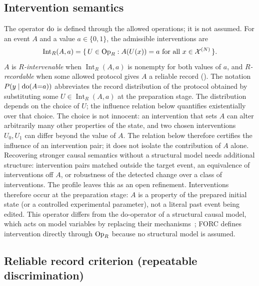 \subsection{Intervention semantics}\label{sec:intervention-semantics}

The operator $\mathrm{do}$ is defined through the allowed operations;
it is not assumed.  For an event $A$ and a value $a \in \{0, 1\}$, the
admissible interventions are
\begin{equation}
  \operatorname{Int}_R(A, a)
  = \{\, U \in \mathrm{Op}_{R} :
     A(U(x)) = a \text{ for all } x \in \mathcal{X}^{(N)} \,\}.\label{eq:intervention-set}
\end{equation}
$A$ is \emph{$R$-intervenable} when $\operatorname{Int}_R(A, a)$ is
nonempty for both values of $a$, and \emph{$R$-recordable} when some
allowed protocol gives $A$ a reliable record
().  The notation
$P(y \mid \mathrm{do}(A{=}a))$ abbreviates the record distribution of
the protocol obtained by substituting some
$U \in \operatorname{Int}_R(A, a)$ at the preparation stage.  The
distribution depends on the choice of $U$; the influence relation below
quantifies existentially over that choice.  The choice is not
innocent: an intervention that sets $A$ can alter arbitrarily many
other properties of the state, and two chosen interventions $U_0, U_1$
can differ beyond the value of $A$.  The relation below therefore
certifies the influence of an intervention pair; it does not isolate
the contribution of $A$ alone.  Recovering stronger causal semantics
without a structural model needs additional structure: intervention
pairs matched outside the target event, an equivalence of
interventions off $A$, or robustness of the detected change over a
class of interventions.  The profile leaves this as an open
refinement. Interventions therefore
occur at the preparation stage: $A$ is a property of the prepared
initial state (or a controlled experimental parameter), not a literal
past event being edited.  This operator differs from the do-operator of
a structural causal model, which acts on model variables by replacing
their mechanisms~\cite{pearl1995causal,pearl2009causality}; FORC
defines intervention directly through $\mathrm{Op}_{R}$ because no
structural model is assumed.

\subsection{Reliable record criterion (repeatable discrimination)}\label{sec:reliable-record}

